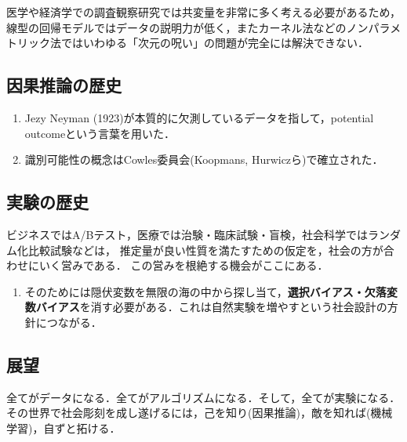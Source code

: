 \documentclass[uplatex,dvipdfmx]{jsreport}
\begin{document}
\begin{history}[セミパラメトリックモデル]
    医学や経済学での調査観察研究では共変量を非常に多く考える必要があるため，線型の回帰モデルではデータの説明力が低く，またカーネル法などのノンパラメトリック法ではいわゆる「次元の呪い」の問題が完全には解決できない．
\end{history}

\subsection{因果推論の歴史}

\begin{history}[因果推論の歴史]\mbox{}
    \begin{enumerate}
        \item Jezy Neyman (1923)が本質的に欠測しているデータを指して，potential outcomeという言葉を用いた．
        \item 識別可能性の概念はCowles委員会(Koopmans, Hurwiczら)で確立された．
    \end{enumerate}
\end{history}

\subsection{実験の歴史}

\begin{history}
    ビジネスではA/Bテスト，医療では治験・臨床試験・盲検，社会科学ではランダム化比較試験などは，
    推定量が良い性質を満たすための仮定を，社会の方が合わせにいく営みである．
    この営みを根絶する機会がここにある．
    \begin{enumerate}
        \item そのためには隠伏変数を無限の海の中から探し当て，\textbf{選択バイアス・欠落変数バイアス}を消す必要がある．これは自然実験を増やすという社会設計の方針につながる．
    \end{enumerate}
\end{history}

\subsection{展望}

\begin{tcolorbox}[colframe=ForestGreen, colback=ForestGreen!10!white,breakable,colbacktitle=ForestGreen!40!white,coltitle=black,fonttitle=\bfseries\sffamily,
title=]
    全てがデータになる．全てがアルゴリズムになる．そして，全てが実験になる．
    その世界で社会彫刻を成し遂げるには，己を知り(因果推論)，敵を知れば(機械学習)，自ずと拓ける．
\end{tcolorbox}
\end{document}
